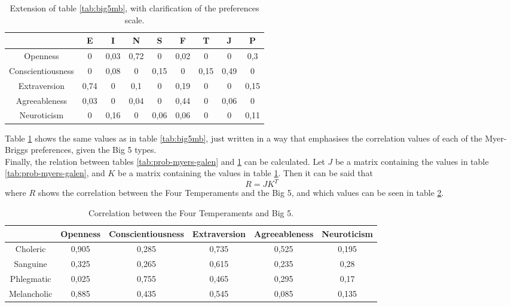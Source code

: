 \begin{table}[H]
    \caption{Extension of table \ref{tab:big5mb}, with clarification of the preferences scale.}
	\centering
    \scriptsize
    \begin{tabular}{|c||c|c||c|c||c|c||c|c|}
    	\hline
    	& E & I & N & S & F & T & J & P\\
        \hline
		Openness & 0 & 0,03 & 0,72 & 0 & 0,02 & 0 & 0 & 0,3\\
        \hline
		Conscientiousness & 0 & 0,08 & 0 & 0,15 & 0 & 0,15 & 0,49 & 0\\
        \hline
		Extraversion & 0,74 & 0 & 0,1 & 0 & 0,19 & 0 & 0 & 0,15\\
		\hline
		Agreeableness & 0,03 & 0 & 0,04 & 0 & 0,44 & 0 & 0,06 & 0\\
        \hline
		Neuroticism & 0 & 0,16 & 0 & 0,06 & 0,06 & 0 & 0 & 0,11\\
		\hline
    \end{tabular}
    \label{tab:correlationExtended}
\end{table}
Table \ref{tab:correlationExtended} shows the same values as in table \ref{tab:big5mb}, just written in a way that emphasises the correlation values of each of the Myer-Briggs preferences, given the Big 5 types.\\
Finally, the relation between tables \ref{tab:prob-myers-galen} and \ref{tab:correlationExtended} can be calculated.
Let $J$ be a matrix containing the values in table \ref{tab:prob-myers-galen}, and $K$ be a matrix containing the values in table \ref{tab:correlationExtended}. Then it can be said that $$R=JK^T$$ where $R$ shows the correlation between the Four Temperaments and the Big 5, and which values can be seen in table \ref{tab:results}.
\begin{table}[H]
    \caption{Correlation between the Four Temperaments and Big 5.}
    \scriptsize
	\centering
	\begin{tabular}{|c|c|c|c|c|c|}
    	\hline
		& Openness& Conscientiousness & Extraversion & Agreeableness & Neuroticism\\
        \hline
		Choleric & 0,905 & 0,285 & 0,735 & 0,525 & 0,195\\
        \hline
		Sanguine & 0,325 & 0,265 & 0,615 & 0,235 & 0,28\\
        \hline
		Phlegmatic & 0,025 & 0,755 & 0,465 & 0,295 & 0,17\\
        \hline
		Melancholic & 0,885 & 0,435 & 0,545 & 0,085 & 0,135\\
		\hline		
	\end{tabular}
    \label{tab:results}
\end{table}
